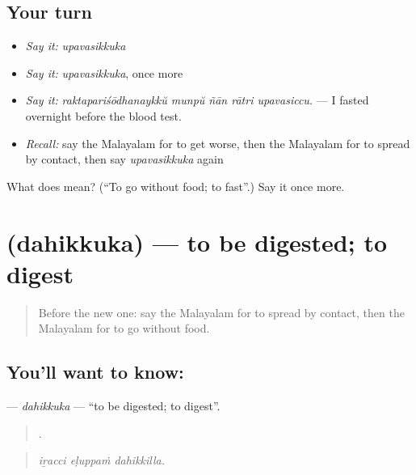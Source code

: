\subsection*{Your turn}
\begin{itemize}
\raggedright
  \item \emph{Say it:} \emph{upavasikkuka}
  \item \emph{Say it:} \emph{upavasikkuka}, once more
  \item \emph{Say it:} \emph{raktapariśōdhanaykkŭ munpŭ ñān rātri upavasiccu.} — I fasted overnight before the blood test.
  \item \emph{Recall:} say the Malayalam for to get worse, then the Malayalam for to spread by contact, then say \emph{upavasikkuka} again
\end{itemize}

\begin{tcolorbox}[breakable,colback=teal!4,colframe=teal!35!black,title={Before you move on}]
What does  mean? (\textquotedblleft{}To go without food; to fast\textquotedblright{}.) Say it once more.
\end{tcolorbox}
\section[\texorpdfstring{\ml{ദഹിക്കുക} (dahikkuka)}{ദഹിക്കുക (dahikkuka)}]{ (dahikkuka) — to be digested; to digest}

\label{lesson:ML-C541-dahikkuka}



\begin{quote}
Before the new one: say the Malayalam for to spread by contact, then the Malayalam for to go without food.
\end{quote}

\subsection*{You'll want to know: }
\textbf{} — \emph{dahikkuka} — \textquotedblleft{}to be digested; to digest\textquotedblright{}.

\begin{quote}
  .
\end{quote}

\begin{quote}
\emph{iṟacci eḷuppaṁ dahikkilla.}
\end{quote}

